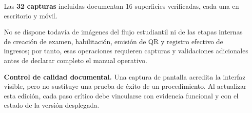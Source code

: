 \documentclass[11pt,a4paper]{article}
\begin{document}
Las \textbf{32 capturas} incluidas documentan
16 superficies verificadas, cada una en escritorio y móvil.

No se dispone todavía de imágenes del flujo estudiantil
ni de las etapas internas de creación de examen,
habilitación, emisión de QR y registro efectivo de ingresos;
por tanto, esas operaciones requieren capturas y validaciones
adicionales antes de declarar completo el manual operativo.

\begin{notebox}
\textbf{Control de calidad documental.}
Una captura de pantalla acredita la interfaz visible,
pero no sustituye una prueba de éxito de un procedimiento.
Al actualizar esta edición, cada paso crítico debe vincularse
con evidencia funcional y con el estado de la versión desplegada.
\end{notebox}
\end{document}

